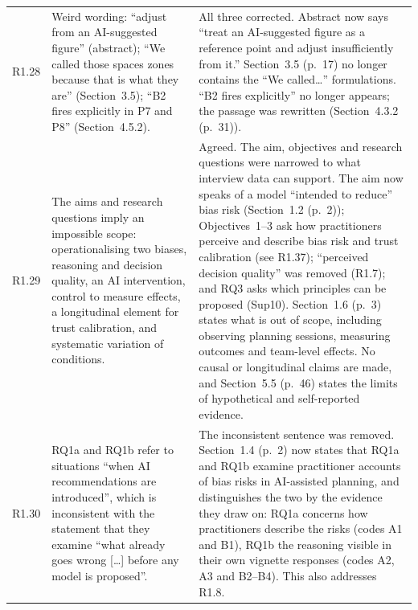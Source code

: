 \documentclass[12pt,a4paper,twoside]{article}
\begin{document}
{\begin{longtable}{p{1cm}p{6.7cm}p{7cm}}
R1.28 &
Weird wording: ``adjust from an AI-suggested figure'' (abstract); ``We called those
spaces zones because that is what they are'' (Section~3.5); ``B2 fires explicitly in
P7 and P8'' (Section~4.5.2). &
All three corrected. Abstract now says ``treat an AI-suggested figure as a reference
point and adjust insufficiently from it.'' Section~3.5 (p.~17) no longer contains the ``We
called\ldots'' formulations. ``B2 fires explicitly'' no longer appears; the passage was rewritten (Section~4.3.2 (p.~31)). \\

R1.29 &
The aims and research questions imply an impossible scope: operationalising two biases, reasoning and decision quality, an AI intervention, control to measure effects, a longitudinal element for trust calibration, and systematic variation of conditions. &
Agreed. The aim, objectives and research questions were narrowed to what interview data can support. The aim now speaks of a model ``intended to reduce'' bias risk (Section~1.2 (p.~2)); Objectives~1--3 ask how practitioners perceive and describe bias risk and trust calibration (see R1.37); ``perceived decision quality'' was removed (R1.7); and RQ3 asks which principles can be proposed (Sup10). Section~1.6 (p.~3) states what is out of scope, including observing planning sessions, measuring outcomes and team-level effects. No causal or longitudinal claims are made, and Section~5.5 (p.~46) states the limits of hypothetical and self-reported evidence. \\

R1.30 &
RQ1a and RQ1b refer to situations ``when AI recommendations are introduced'', which is inconsistent with the statement that they examine ``what already goes wrong {[}\ldots{]} before any model is proposed''. &
The inconsistent sentence was removed. Section~1.4 (p.~2) now states that RQ1a and RQ1b examine practitioner accounts of bias risks in AI-assisted planning, and distinguishes the two by the evidence they draw on: RQ1a concerns how practitioners describe the risks (codes A1 and B1), RQ1b the reasoning visible in their own vignette responses (codes A2, A3 and B2--B4). This also addresses R1.8. \\


\end{longtable}}
\end{document}
